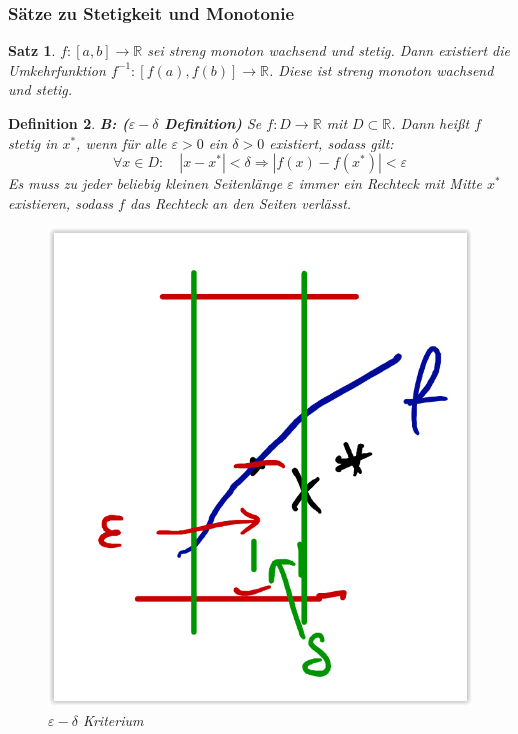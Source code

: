 \documentclass[12pt,a4paper]{report}%
\newtheorem{satz}{Satz}[section]
\newtheorem{definition}[satz]{Definition}
\numberwithin{equation}{section}
\newcommand{\R}{\mathbb{R}} %
\numberwithin{equation}{subsection}
\begin{document}
  \subsubsection{Sätze zu Stetigkeit und Monotonie}
  \begin{satz}
    $f:[a,b] \rightarrow \R$ sei streng monoton wachsend und  stetig. Dann existiert die Umkehrfunktion $f^{-1}:[f(a),f(b)]\rightarrow \R$. Diese ist streng monoton wachsend und stetig.
  \end{satz}
  \begin{definition}
    \textbf{B: ($\varepsilon -\delta$ Definition)} \newline
    Se $f:D\rightarrow \R$ mit $D \subset \R$. Dann heißt $f$ stetig in $x^*$, wenn für alle $\varepsilon > 0$ ein $\delta > 0$ existiert, sodass gilt: 
    \begin{equation}
      \forall x \in D:\quad |x - x^*| < \delta \Rightarrow |f(x) - f(x^*)| < \varepsilon
    \end{equation}
    Es muss zu jeder beliebig kleinen Seitenlänge $\varepsilon$ immer ein Rechteck mit Mitte $x^*$ existieren, sodass $f$ das Rechteck an den Seiten verlässt.
    \begin{figure}[H] 
			\centering
			\captionsetup{justification=centering}
			\includegraphics[width=0.2\linewidth]{stetigkeit_eps_del.png}
			\caption{$\varepsilon - \delta$ Kriterium \protect\cite{HM12}}
			\label{fig:stetigkeit_eps_del}
    \end{figure} \label{def:stet_b}
  \end{definition}
  
\end{document}

